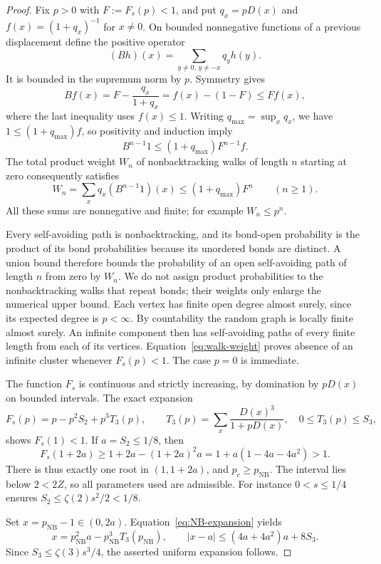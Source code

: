 \documentclass[11pt]{article}
\theoremstyle{definition}
\newcommand{\NB}{\mathrm{NB}}
\begin{document}
\begin{proof}
Fix $p>0$ with $F:=F_s(p)<1$, and put $q_x=pD(x)$ and
$f(x)=(1+q_x)^{-1}$ for $x\ne0$. On bounded nonnegative functions of a
previous displacement define the positive operator
\[
 (Bh)(x)=\sum_{y\ne0,\,y\ne-x}q_yh(y).
\]
It is bounded in the supremum norm by $p$. Symmetry gives
\[
 Bf(x)=F-\frac{q_x}{1+q_x}=f(x)-(1-F)\le Ff(x),
\]
where the last inequality uses $f(x)\le1$. Writing
$q_{\max}=\sup_xq_x$, we have $1\le(1+q_{\max})f$, so positivity and
induction imply
\[
 B^{n-1}1\le(1+q_{\max})F^{n-1}f.
\]
The total product weight $W_n$ of nonbacktracking walks of length $n$
starting at zero consequently satisfies
\begin{equation}\label{eq:walk-weight}
 W_n=\sum_xq_x(B^{n-1}1)(x)
 \le(1+q_{\max})F^n\qquad(n\ge1).
\end{equation}
All these sums are nonnegative and finite; for example $W_n\le p^n$.

Every self-avoiding path is nonbacktracking, and its bond-open probability
is the product of its bond probabilities because its unordered bonds are
distinct. A union bound therefore bounds the probability of an open
self-avoiding path of length $n$ from zero by $W_n$. We do not assign
product probabilities to the nonbacktracking walks that repeat bonds;
their weights only enlarge the numerical upper bound. Each vertex has
finite open degree almost surely, since its expected degree is $p<\infty$.
By countability the random graph is locally finite almost surely. An infinite
component then has self-avoiding paths of every finite length from each of
its vertices. Equation~\eqref{eq:walk-weight} proves absence of an infinite
cluster whenever $F_s(p)<1$. The case $p=0$ is immediate.

The function $F_s$ is continuous and strictly increasing, by domination
by $pD(x)$ on bounded intervals. The exact expansion
\begin{equation}\label{eq:NB-expansion}
 F_s(p)=p-p^2S_2+p^3T_3(p),\qquad
 T_3(p)=\sum_x\frac{D(x)^3}{1+pD(x)},\quad0\le T_3(p)\le S_3,
\end{equation}
shows $F_s(1)<1$. If $a=S_2\le1/8$, then
\[
 F_s(1+2a)\ge1+2a-(1+2a)^2a
 =1+a(1-4a-4a^2)>1.
\]
There is thus exactly one root in $(1,1+2a)$, and $p_c\ge p_\NB$.
The interval lies below $2<2Z$, so all parameters used are admissible.
For instance $0<s\le1/4$ ensures $S_2\le\zeta(2)s^2/2<1/8$.

Set $x=p_\NB-1\in(0,2a)$. Equation~\eqref{eq:NB-expansion} yields
\[
 x=p_\NB^2a-p_\NB^3T_3(p_\NB),\qquad
 |x-a|\le(4a+4a^2)a+8S_3.
\]
Since $S_3\le\zeta(3)s^3/4$, the asserted uniform expansion follows.
\end{proof}
\end{document}
